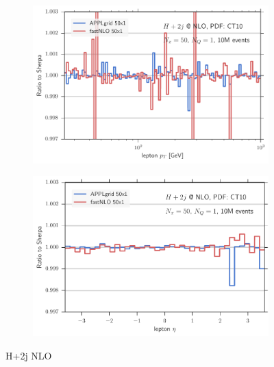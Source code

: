\begin{figure}
\begin{subfigure}[]{0.49\textwidth}
	\includegraphics[width=\textwidth]{images/hjjnlo_lpt_50v30.pdf}
\end{subfigure}
\hfill
\begin{subfigure}[]{0.49\textwidth}
	\includegraphics[width=\textwidth]{images/hjjnlo_leta_50v30.pdf}
\end{subfigure}
\caption{H+2j NLO}
\label{fig:hjjnlo_validation}
\end{figure}
%


